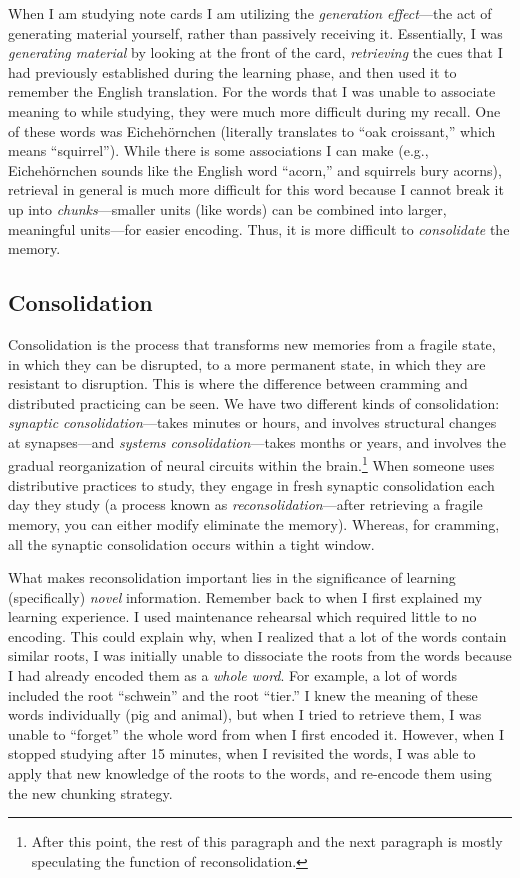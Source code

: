 \documentclass[stu,12pt,floatsintext]{apa7}
\begin{document}
When I am studying note cards I am utilizing the \textit{generation effect}---the act of generating material yourself, rather than passively receiving it. Essentially, I was \textit{generating material} by looking at the front of the card, \textit{retrieving} the cues that I had previously established during the learning phase, and then used it to remember the English translation. For the words that I was unable to associate meaning to while studying, they were much more difficult during my recall. One of these words was Eicheh\"ornchen (literally translates to ``oak croissant,'' which means ``squirrel''). While there is some associations I can make (e.g., Eicheh\"ornchen sounds like the English word ``acorn,'' and squirrels bury acorns), retrieval in general is much more difficult for this word because I cannot break it up into \textit{chunks}---smaller units (like words) can be combined into larger, meaningful units---for easier encoding. Thus, it is more difficult to \textit{consolidate} the memory.

\hypertarget{consolidation}{}
\subsection{Consolidation}

Consolidation is the process that transforms new memories from a fragile state, in which they can be disrupted, to a more permanent state, in which they are resistant to disruption. This is where the difference between cramming and distributed practicing can be seen. We have two different kinds of consolidation: \textit{synaptic consolidation}---takes minutes or hours, and involves structural changes at synapses---and \textit{systems consolidation}---takes months or years, and involves the gradual reorganization of neural circuits within the brain.\footnote{After this point, the rest of this paragraph and the next paragraph is mostly speculating the function of reconsolidation.} When someone uses distributive practices to study, they engage in fresh synaptic consolidation each day they study (a process known as \textit{reconsolidation}---after retrieving a fragile memory, you can either modify eliminate the memory). Whereas, for cramming, all the synaptic consolidation occurs within a tight window. 

What makes reconsolidation important lies in the significance of learning (specifically) \textit{novel} information. Remember back to when I first explained my learning experience. I used maintenance rehearsal which required little to no encoding. This could explain why, when I realized that a lot of the words contain similar roots, I was initially unable to dissociate the roots from the words because I had already encoded them as a \textit{whole word}. For example, a lot of words included the root ``schwein'' and the root ``tier.'' I knew the meaning of these words individually (pig and animal), but when I tried to retrieve them, I was unable to ``forget'' the whole word from when I first encoded it. However, when I stopped studying after 15 minutes, when I revisited the words, I was able to apply that new knowledge of the roots to the words, and re-encode them using the new chunking strategy.
\end{document}
